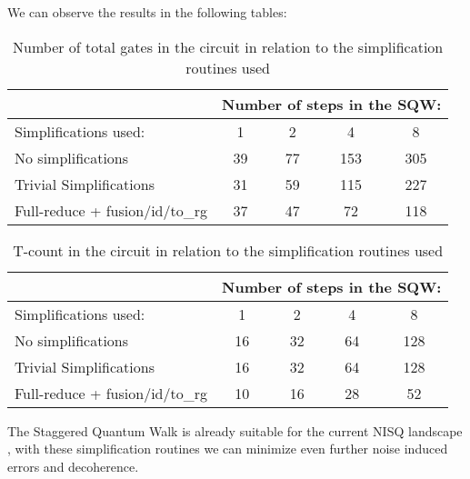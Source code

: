 We can observe the results in the following tables:

\begin{table}[H]
\centering
\begin{tabular}{|l|cccc|}
\hline
                               & \multicolumn{4}{l|}{Number of steps in the SQW:}                                   \\ \hline
Simplifications used:          & \multicolumn{1}{c|}{1}  & \multicolumn{1}{c|}{2}  & \multicolumn{1}{c|}{4}   & 8   \\ \hline
No simplifications             & \multicolumn{1}{c|}{39} & \multicolumn{1}{c|}{77} & \multicolumn{1}{c|}{153} & 305 \\ \hline
Trivial Simplifications        & \multicolumn{1}{c|}{31} & \multicolumn{1}{c|}{59} & \multicolumn{1}{c|}{115} & 227 \\ \hline
Full-reduce + fusion/id/to\_rg & \multicolumn{1}{c|}{37} & \multicolumn{1}{c|}{47} & \multicolumn{1}{c|}{72}  & 118 \\ \hline
\end{tabular}
\caption{Number of total gates in the circuit in relation to the simplification routines used}
\label{tab:total-gates}
\end{table}

\begin{table}[H]
\centering
\begin{tabular}{|l|cccc|}
\hline
                               & \multicolumn{4}{l|}{Number of steps in the SQW:}                                  \\ \hline
Simplifications used:          & \multicolumn{1}{c|}{1}  & \multicolumn{1}{c|}{2}  & \multicolumn{1}{c|}{4}  & 8   \\ \hline
No simplifications             & \multicolumn{1}{c|}{16} & \multicolumn{1}{c|}{32} & \multicolumn{1}{c|}{64} & 128 \\ \hline
Trivial Simplifications        & \multicolumn{1}{c|}{16} & \multicolumn{1}{c|}{32} & \multicolumn{1}{c|}{64} & 128 \\ \hline
Full-reduce + fusion/id/to\_rg & \multicolumn{1}{c|}{10} & \multicolumn{1}{c|}{16} & \multicolumn{1}{c|}{28} & 52  \\ \hline
\end{tabular}
\caption{T-count in the circuit in relation to the simplification routines used}
\label{tab:t-count}
\end{table}

The Staggered Quantum Walk is already suitable for the current NISQ landscape \cite{MScJaime}, with these simplification routines we can minimize even further noise induced errors and decoherence.










